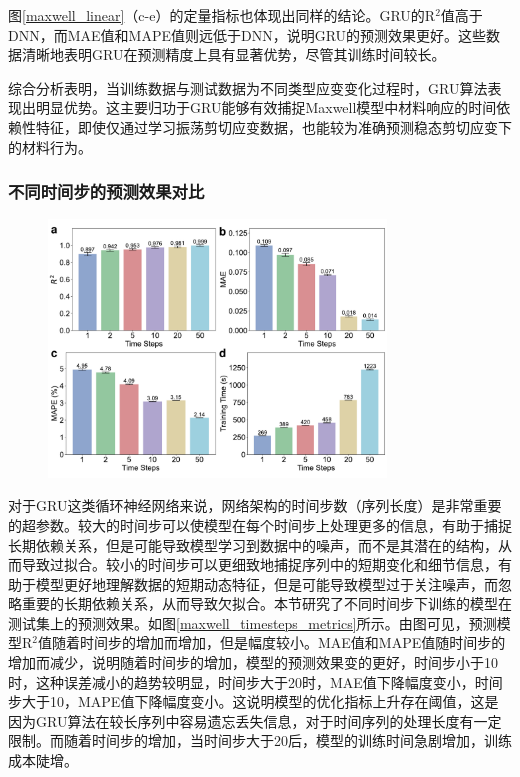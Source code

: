 图\ref{maxwell_linear}（c-e）的定量指标也体现出同样的结论。GRU的R$^2$值高于DNN，而MAE值和MAPE值则远低于DNN，说明GRU的预测效果更好。这些数据清晰地表明GRU在预测精度上具有显著优势，尽管其训练时间较长。

综合分析表明，当训练数据与测试数据为不同类型应变变化过程时，GRU算法表现出明显优势。这主要归功于GRU能够有效捕捉Maxwell模型中材料响应的时间依赖性特征，即使仅通过学习振荡剪切应变数据，也能较为准确预测稳态剪切应变下的材料行为。
\subsubsection{不同时间步的预测效果对比}
\begin{figure}[htbp]
  \centering
  \includegraphics[width=0.8\textwidth]{Fig/Maxwell_timesteps_metrics.pdf}
\end{figure}
对于GRU这类循环神经网络来说，网络架构的时间步数（序列长度）是非常重要的超参数。较大的时间步可以使模型在每个时间步上处理更多的信息，有助于捕捉长期依赖关系，但是可能导致模型学习到数据中的噪声，而不是其潜在的结构，从而导致过拟合。较小的时间步可以更细致地捕捉序列中的短期变化和细节信息，有助于模型更好地理解数据的短期动态特征，但是可能导致模型过于关注噪声，而忽略重要的长期依赖关系，从而导致欠拟合。本节研究了不同时间步下训练的模型在测试集上的预测效果。如图\ref{maxwell_timesteps_metrics}所示。由图可见，预测模型R$^2$值随着时间步的增加而增加，但是幅度较小。MAE值和MAPE值随时间步的增加而减少，说明随着时间步的增加，模型的预测效果变的更好，时间步小于10时，这种误差减小的趋势较明显，时间步大于20时，MAE值下降幅度变小，时间步大于10，MAPE值下降幅度变小。这说明模型的优化指标上升存在阈值，这是因为GRU算法在较长序列中容易遗忘丢失信息，对于时间序列的处理长度有一定限制。而随着时间步的增加，当时间步大于20后，模型的训练时间急剧增加，训练成本陡增。

